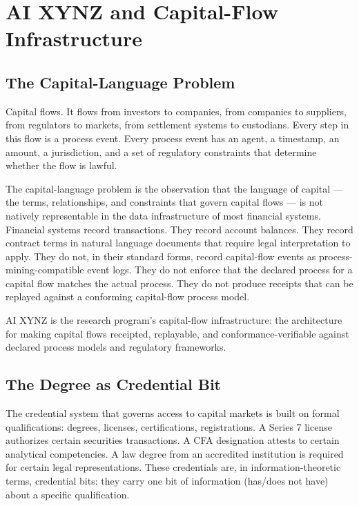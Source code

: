 \chapter{AI XYNZ and Capital-Flow Infrastructure}
\label{chap:ai_xynz}

\section{The Capital-Language Problem}

Capital flows. It flows from investors to companies, from companies to suppliers, from regulators to markets, from settlement systems to custodians. Every step in this flow is a process event. Every process event has an agent, a timestamp, an amount, a jurisdiction, and a set of regulatory constraints that determine whether the flow is lawful.

The capital-language problem is the observation that the language of capital --- the terms, relationships, and constraints that govern capital flows --- is not natively representable in the data infrastructure of most financial systems. Financial systems record transactions. They record account balances. They record contract terms in natural language documents that require legal interpretation to apply. They do not, in their standard forms, record capital-flow events as process-mining-compatible event logs. They do not enforce that the declared process for a capital flow matches the actual process. They do not produce receipts that can be replayed against a conforming capital-flow process model.

AI XYNZ is the research program's capital-flow infrastructure: the architecture for making capital flows receipted, replayable, and conformance-verifiable against declared process models and regulatory frameworks.

\section{The Degree as Credential Bit}

The credential system that governs access to capital markets is built on formal qualifications: degrees, licenses, certifications, registrations. A Series 7 license authorizes certain securities transactions. A CFA designation attests to certain analytical competencies. A law degree from an accredited institution is required for certain legal representations. These credentials are, in information-theoretic terms, credential bits: they carry one bit of information (has/does not have) about a specific qualification.

